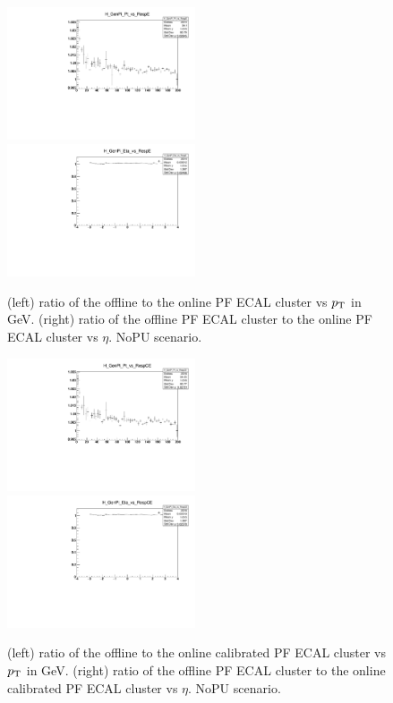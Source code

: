 
\begin{figure}
\includegraphics[width=0.495\textwidth]{./plots_pdf/ECAL_plots/Prod6/NoPU/H_GenPi_Pt_vs_RespE.pdf}
\includegraphics[width=0.495\textwidth]{./plots_pdf/ECAL_plots/Prod6/NoPU/H_GenPi_Eta_vs_RespE.pdf}
\caption [HLT vs offline PF ECAL cluster - NoPU scenario]{(left) ratio of the offline to the online PF ECAL cluster vs $p_{\mathrm{T}}$ in GeV. (right) ratio of the offline PF ECAL cluster to the online PF ECAL cluster vs $\eta$. NoPU scenario.}
\label{fig:NoPU_ECAL_Offline_vs_Online_E}
\end{figure}

\begin{figure}
\includegraphics[width=0.495\textwidth]{./plots_pdf/ECAL_plots/Prod6/NoPU/H_GenPi_Pt_vs_RespCE.pdf}
\includegraphics[width=0.495\textwidth]{./plots_pdf/ECAL_plots/Prod6/NoPU/H_GenPi_Eta_vs_RespCE.pdf}
\caption[HLT vs offline calibrated PF ECAL cluster - NoPU scenario]{(left) ratio of the offline to the online calibrated PF ECAL cluster vs $p_{\mathrm{T}}$ in GeV. (right) ratio of the offline PF ECAL cluster to the online calibrated PF ECAL cluster vs $\eta$. NoPU scenario.}
\label{fig:NoPU_ECAL_Offline_vs_Online_CE}
\end{figure}                                                                                                                                                                       


